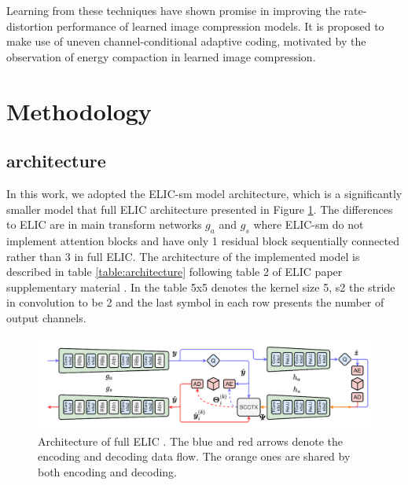 \documentclass{article}
\begin{document}
Learning from these techniques have shown promise in improving the rate-distortion performance of learned image compression models. It is proposed to make use of uneven channel-conditional adaptive coding, motivated by the observation of energy compaction in learned image compression.

\section{Methodology}
\label{sec:methods}
\subsection{architecture}
\label{sec:architecture}
In this work, we adopted the ELIC-sm model architecture, which is a significantly smaller model that full ELIC architecture presented in Figure \ref{fig:architecture}. The differences to ELIC are in main transform networks $g_a$ and $g_s$ where ELIC-sm do not implement attention blocks and have only 1 residual block sequentially connected rather than 3 in full ELIC. The architecture of the implemented model is described in table \ref{table:architecture} following table 2 of ELIC paper supplementary material \cite{ELIC}. In the table 5x5 denotes the kernel size 5, s2 the stride in convolution to be 2 and the last symbol in each row presents the number of output channels. 

\begin{figure}[h!]
    \centering
    \includegraphics[width=7in]{architecture.png}
    \caption{Architecture of full ELIC \cite{ELIC}. The
blue and red arrows denote the encoding and decoding data flow. The orange ones are shared by both encoding and decoding.}
    \label{fig:architecture}
\end{figure}
\end{document}
